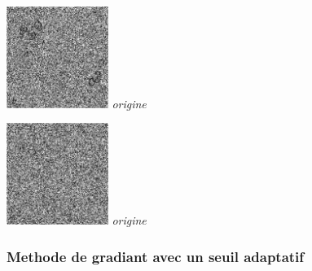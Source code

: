 \documentclass[a4,12pt]{article}
\begin{document}
\begin{minipage}[c]{0.20\linewidth}
	\begin{center}
		\includegraphics[width = 33mm]{./img/p2test_grad_mean_globulesbb26.jpg}
		\textit{origine}
	\end{center}
\end{minipage}
\begin{minipage}[c]{0.20\linewidth}
	\begin{center}
		\includegraphics[width = 33mm]{./img/p2test_grad_mean_globulesbb50.jpg}
		\textit{origine}
	\end{center}
\end{minipage}

\subsubsection{Methode de gradiant avec un seuil adaptatif}
\end{document}
